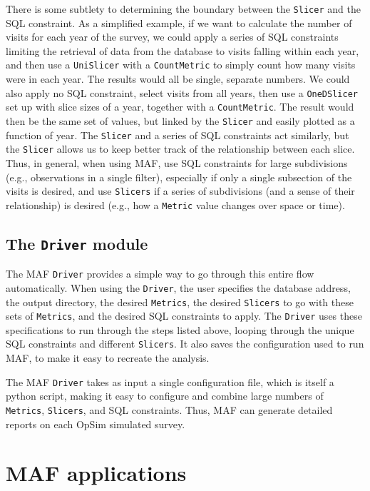 \documentclass[]{spie}  %
\begin{document}
There is some subtlety to determining the boundary between the {\tt Slicer}
and the SQL constraint. As a simplified example, if we want to
calculate the number of visits for each year of the survey, we could
apply a series of SQL constraints limiting the retrieval of data from
the database to visits falling within each year, and then use a
{\tt UniSlicer} with a {\tt CountMetric} to simply count how many visits were in
each year. The results would all be single, separate numbers. We could
also apply no SQL constraint, select visits from all years, then use a
{\tt OneDSlicer} set up with slice sizes of a year, together with a 
{\tt CountMetric}. The result would then be the same set of values, but linked by
the {\tt Slicer} and easily plotted as a function of year. The {\tt Slicer} and a
series of SQL constraints act similarly, but the {\tt Slicer} allows us to
keep better track of the relationship between each slice. Thus, in
general, when using MAF, use SQL constraints for large subdivisions
(e.g., observations in a single filter), especially if only a single
subsection of the visits is desired, and use {\tt Slicers} if a series of
subdivisions (and a sense of their relationship) is desired (e.g., how
a {\tt Metric} value changes over space or time).

\subsection{The {\tt Driver} module}

The MAF {\tt Driver} provides a simple way to go through this entire flow
automatically. When using the {\tt Driver}, the user specifies the database
address, the output directory, the desired {\tt Metrics}, the desired
{\tt Slicers} to go with these sets of {\tt Metrics}, and the desired SQL
constraints to apply. The {\tt Driver} uses these specifications to run
through the steps listed above, looping through the unique SQL
constraints and different {\tt Slicers}. It also saves the configuration
used to run MAF, to make it easy to recreate the analysis. 

The MAF {\tt Driver} takes as input a single configuration file, which is
itself a python script, making it easy to configure and combine large
numbers of {\tt Metrics}, {\tt Slicers}, and SQL constraints.  Thus, MAF can
generate detailed reports on each OpSim simulated survey.

\section{MAF applications}
\label{sec:examples}
\end{document}
